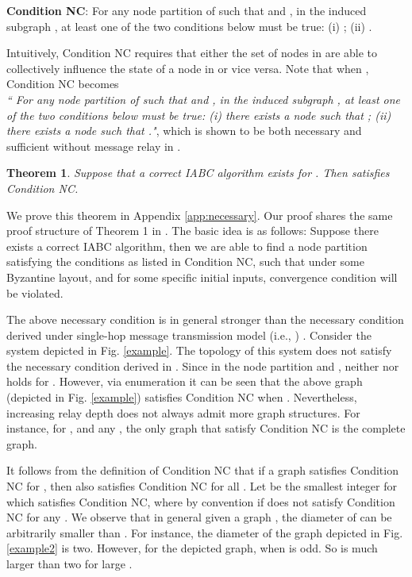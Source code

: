 \documentclass[letterpaper, 11pt]{article}
\newtheorem{theorem}{Theorem}[section]
\begin{document}
\noindent\textbf{Condition NC}:
For any node partition  of  such that  and , in the induced subgraph ,
at least one of the two conditions below must be true: (i) ; (ii) . 

Intuitively, Condition NC requires that either the set of nodes in  are able to collectively influence the state of a node in  or vice versa. Note that when , Condition NC becomes\\
\emph{``
For any node partition  of  such that  and , in the induced subgraph ,
at least one of the two conditions below must be true: (i) there exists a node  such that ; (ii) there exists a node  such that ."}, which is shown to be both necessary and sufficient without message relay in \cite{Vaidya2012IABC}.



\begin{theorem}
\label{thm:nc}
Suppose that a correct IABC algorithm exists for . Then  satisfies Condition NC.
\end{theorem}
We prove this theorem in Appendix \ref{app:necessary}. Our proof shares the same proof structure of Theorem 1 in \cite{Vaidya2012IABC}.
The basic idea is as follows: Suppose there exists a correct IABC algorithm, then we are able to find a node partition satisfying the conditions as listed in Condition NC,
such that under some Byzantine layout, and for some specific initial inputs, convergence condition will be violated.






The above necessary condition is in general stronger than the necessary condition derived under single-hop message transmission model (i.e., ) \cite{Vaidya2012IABC}.
Consider the system depicted in Fig. \ref{example}.  The topology of this system does not satisfy the necessary condition derived in \cite{Vaidya2012IABC}. Since in the node partition  and , neither  nor  holds for . However, via enumeration it can be seen that the above graph (depicted in Fig. \ref{example}) satisfies Condition NC when . Nevertheless, increasing relay depth does not always admit more graph structures. For instance, for ,  and any , the only graph that satisfy Condition NC is the complete graph.

It follows from the definition of Condition NC that if a graph  satisfies Condition NC for , then  also satisfies Condition NC for all . Let  be the smallest integer for which  satisfies Condition NC, where  by convention if  does not satisfy Condition NC for any . We observe that in general given a graph , the diameter of  can be arbitrarily smaller than . For instance, the diameter of the graph depicted in Fig. \ref{example2} is two. However, for the depicted graph,  when  is odd. So  is much larger than two for large .
\end{document}
